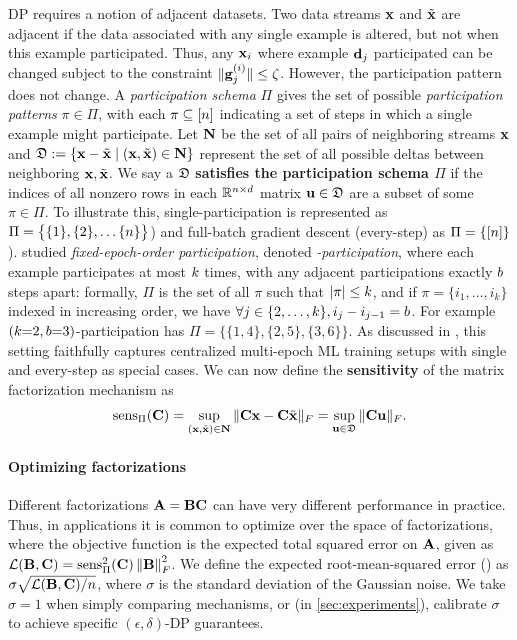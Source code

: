 \documentclass{article}
\begin{document}
DP requires a notion of adjacent datasets. Two data streams $\mathbf{x}$ and $\tilde{\mathbf{x}}$ are adjacent if the data associated with any single example is altered, but not when this example participated. Thus, any $\mathbf{x}_i$ where example $\mathbf{d}_j$ participated can be changed subject to the constraint $\| \mathbf{g}^{(i)}_j \| \le \zeta$. However, the participation pattern does not change. A \emph{participation schema} $\Pi$ gives the set of possible \emph{participation patterns} $\pi \in \Pi$, with each $\pi \subseteq [n]$ indicating a set of steps in which a single example might participate.
%
Let $\mathbf{N}$ be the set of all pairs of neighboring streams $\mathbf{x}$ and $\mathfrak{D} := \left\{ \mathbf{x} - \tilde{\mathbf{x}} \mid (\mathbf{x}, \tilde{\mathbf{x}}) \in \mathbf{N} \right\}$ represent the set of all possible deltas between neighboring $\mathbf{x},\tilde{\mathbf{x}}$. %
We say a $\mathfrak{D}$ \textbf{satisfies the participation schema $\Pi$} if the indices of all nonzero rows in each $\mathbb{R}^{n \times d}$ matrix $\mathbf{u} \in \mathfrak{D}$ are a subset of some $\pi \in \Pi$. 
To illustrate this, single-participation is represented as $\Pi = \big\{ \{1\}, \{2\}, \dots \{n\}\big\}$) and full-batch gradient descent (every-step) as $\Pi = \{ [n]\}$).  \citet{choquette2022multi} studied \emph{fixed-epoch-order participation}, denoted \emph{\multiepoch-participation}, where each example participates at most $k$ times, with any adjacent participations exactly $b$ steps apart: formally, $\Pi$ is the set of all $\pi$ such that $|\pi| \le k$, and if $\pi = \{i_1, \dots, i_k\}$ indexed in increasing order, we have $\forall j \in \{2, \dots, k\}, i_j - i_{j-1} = b$. For example $(k{=}2, b{=}3)$-participation has $\Pi = \{\{1, 4\}, \{2, 5\}, \{3, 6\}\}$. As discussed in \citet{choquette2022multi}, this setting faithfully captures centralized multi-epoch ML training setups with single and every-step as special cases.
%
We can now define the \textbf{sensitivity} of the matrix factorization mechanism as
\begin{equation}\label{eq:sensopnorm}
\operatorname{sens}_\Pi(\mathbf{C}) = \sup_{(\mathbf{x}, \tilde{\mathbf{x}}) \in \mathbf{N}} \| \mathbf{C} \mathbf{x} - \mathbf{C} \tilde{\mathbf{x}} \|_F
 = \sup_{\mathbf{u} \in \mathfrak{D}} \| \mathbf{C}\mathbf{u} \|_F. 
\end{equation}
\vspace{-1em}
\paragraph{Optimizing factorizations}
Different factorizations $\mathbf{A} = \mathbf{B} \mathbf{C}$ can have very different performance in practice.  Thus, in \MF applications it is common to optimize over the space of factorizations, where the objective function is the expected total squared error on $\mathbf{A}$, given as $\mathcal{L}(\mathbf{B}, \mathbf{C}) = \operatorname{sens}_\Pi^2(\mathbf{C}) \left\|\mathbf{B}\right\|_F^2$.  We define the expected root-mean-squared error (\rmse) as $\sigma \sqrt{\mathcal{L}(\mathbf{B}, \mathbf{C}) / n}$, where $\sigma$ is the standard deviation of the Gaussian noise. We take $\sigma=1$ when simply comparing mechanisms, or (in \cref{sec:experiments}), calibrate $\sigma$ to achieve specific $(\epsilon, \delta)$-DP guarantees.
\end{document}
